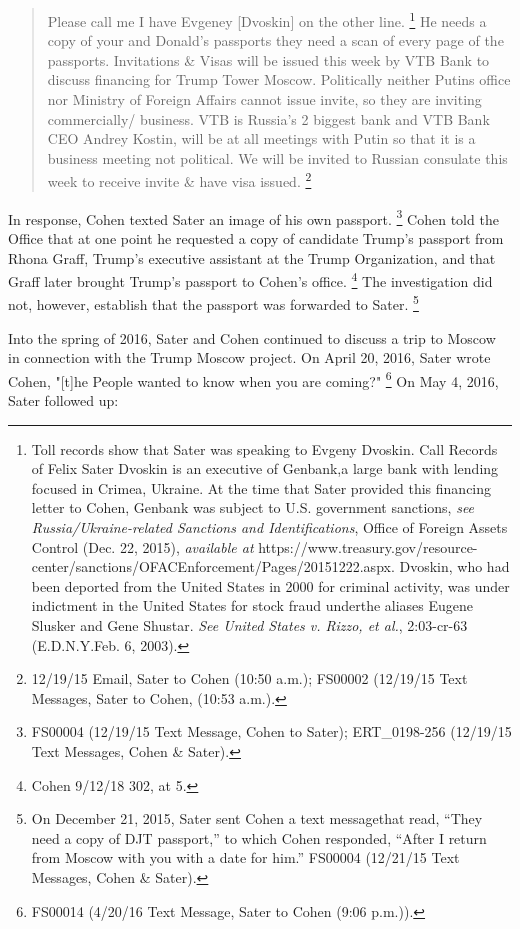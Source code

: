 \begin{quote}
Please call me I have Evgeney [Dvoskin] on the other line.%
\footnote{Toll records show that Sater was speaking to Evgeny Dvoskin.
Call Records of Felix Sater
Dvoskin is an executive of Genbank,a large bank with lending focused in Crimea, Ukraine.
At the time that Sater provided this financing letter to Cohen, Genbank was subject to U.S. government sanctions,
\textit{see Russia/Ukraine-related Sanctions and Identifications}, Office of Foreign Assets Control (Dec. 22, 2015), \textit{available at} https://www.treasury.gov/resource-center/sanctions/OFACEnforcement/Pages/20151222.aspx.
Dvoskin, who had been deported from the United States in 2000 for criminal activity, was under indictment in the United States for stock fraud underthe aliases Eugene Slusker and Gene Shustar.
\textit{See United States v. Rizzo, et al.}, 2:03-cr-63 (E.D.N.Y.Feb. 6, 2003).}
He needs a copy of your and Donald's passports they need a scan of every page of the passports.
Invitations \& Visas will be issued this week by VTB Bank to discuss financing for Trump Tower Moscow. Politically neither Putins office nor Ministry of Foreign Affairs cannot issue invite, so they are inviting commercially/ business.
VTB is Russia's 2 biggest bank and VTB Bank CEO Andrey Kostin, will be at all meetings with Putin so that it is a business meeting not political.
We will be invited to Russian consulate this week to receive invite \& have visa issued.%
\footnote{12/19/15 Email, Sater to Cohen (10:50 a.m.);
FS00002 (12/19/15 Text Messages, Sater to Cohen, (10:53 a.m.).}
\end{quote}

In response, Cohen texted Sater an image of his own passport.%
\footnote{FS00004 (12/19/15 Text Message, Cohen to Sater);
ERT\_0198-256 (12/19/15 Text Messages, Cohen \& Sater).}
Cohen told the Office that at one point he requested a copy of candidate Trump's passport from Rhona Graff, Trump's executive assistant at the Trump Organization, and that Graff later brought Trump's passport to Cohen's office.%
\footnote{Cohen 9/12/18 302, at 5.}
The investigation did not, however, establish that the passport was forwarded to Sater.%
\footnote{On December 21, 2015, Sater sent Cohen a text messagethat read, “They need a copy of DJT passport,” to which Cohen responded, “After I return from Moscow with you with a date for him.”
FS00004 (12/21/15 Text Messages, Cohen \& Sater).}

Into the spring of 2016, Sater and Cohen continued to discuss a trip to Moscow in connection with the Trump Moscow project.
On April 20, 2016, Sater wrote Cohen, "[t]he People wanted to know when you are coming?"%
\footnote{FS00014 (4/20/16 Text Message, Sater to Cohen (9:06 p.m.)).}
On May 4, 2016, Sater followed up:

